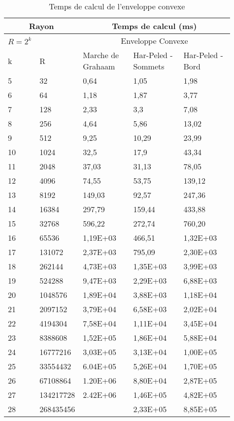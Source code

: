 \begin{table}[H]
  \begin{tabular}{|p{0.09\linewidth}|p{0.13\linewidth}||p{0.23\linewidth}|p{0.23\linewidth}|p{0.23\linewidth}|}
    \hline
    \multicolumn{2}{|c||}{Rayon} & \multicolumn{3}{c|}{Temps de calcul (ms) } \\  \hline 
    $R=2^k$  &  &  \multicolumn{3}{c|}{Enveloppe Convexe}  \\ \hline
    k & R & Marche de Grahaam & Har-Peled - Sommets & Har-Peled - Bord \\
    \hline
    5  & 32        & 0,64     & 1,05     & 1,98\\
    6  & 64        & 1,18     & 1,87     & 3,77\\
    7  & 128       & 2,33     & 3,3      & 7,08\\
    8  & 256       & 4,64     & 5,86     & 13,02\\
    9  & 512       & 9,25     & 10,29    & 23,99\\
    10 & 1024      & 32,5     & 17,9     & 43,34\\
    11 & 2048      & 37,03    & 31,13    & 78,05\\
    12 & 4096      & 74,55    & 53,75    & 139,12\\
    13 & 8192      & 149,03   & 92,57    & 247,36\\
    14 & 16384     & 297,79   & 159,44   & 433,88\\
    15 & 32768     & 596,22   & 272,74   & 760,20\\
    16 & 65536     & 1,19E+03 & 466,51   & 1,32E+03\\
    17 & 131072    & 2,37E+03 & 795,09   & 2,30E+03\\
    18 & 262144    & 4,73E+03 & 1,35E+03 & 3,99E+03\\
    19 & 524288    & 9,47E+03 & 2,29E+03 & 6,88E+03\\
    20 & 1048576   & 1,89E+04 & 3,88E+03 & 1,18E+04\\
    21 & 2097152   & 3,79E+04 & 6,58E+03 & 2,02E+04\\
    22 & 4194304   & 7,58E+04 & 1,11E+04 & 3,45E+04\\
    23 & 8388608   & 1,52E+05 & 1,86E+04 & 5,88E+04\\
    24 & 16777216  & 3,03E+05 & 3,13E+04 & 1,00E+05\\
    25 & 33554432  & 6.04E+05 & 5,26E+04 & 1,70E+05\\
    26 & 67108864  & 1.20E+06 & 8,80E+04 & 2,87E+05\\
    27 & 134217728 & 2.42E+06 & 1,46E+05 & 4,82E+05\\
    28 & 268435456 &          & 2,33E+05 & 8,85E+05\\
    \hline
  \end{tabular} 
  \caption{Temps de calcul de l'enveloppe convexe}
\end{table}

